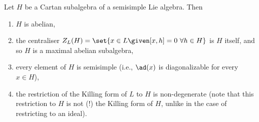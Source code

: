 Let $H$ be a Cartan subalgebra of a semisimple Lie algebra. Then
\begin{enumerate}[label=(\alph*)]
	\item $H$ is abelian,
	\item the centraliser $Z_L(H) = \set{x \in L\given [x, h] = 0~\forall h \in H}$
		is $H$ itself, and so $H$ is a maximal abelian subalgebra,
	\item every element of $H$ is semisimple (i.e., $\ad(x)$ is diagonalizable for
		every $x \in H$),
	\item the restriction of the Killing form of $L$ to $H$ is non-degenerate
		(note that this restriction to $H$ is not (!) the Killing form of $H$, unlike
		in the case of restricting to an ideal).
\end{enumerate}
